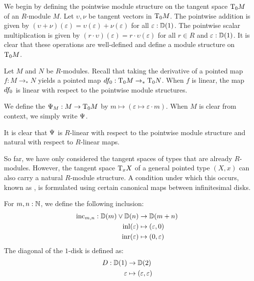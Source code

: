 \begin{definition}\label{def:pointwise-module-structure}
We begin by defining the pointwise module structure on the tangent space $\tangent{M}{0}$ of an $R$-module $M$.
Let $\upsilon, \nu$ be tangent vectors in $\tangent{M}{0}$.
The pointwise addition is given by $(\upsilon + \nu)(\varepsilon) = \upsilon (\varepsilon) + \nu (\varepsilon)$ for all $\varepsilon : \D(1)$.
The pointwise scalar multiplication is given by $(r \cdot \upsilon)(\varepsilon) = r \cdot \upsilon (\varepsilon)$ for all $r \in R$ and $\varepsilon : \D(1)$.
It is clear that these operations are well-defined and define a module structure on $\tangent{M}{0}$.
\end{definition}

\begin{remark}
  Let $M$ and $N$ be $R$-modules.
  Recall that taking the derivative of a pointed map $f : M \to_\ast N$ yields a pointed map $\der{f}{0} : \tangent{M}{0} \to_\ast \tangent{N}{0}$.
  When $f$ is linear, the map $\der{f}{0}$ is linear with respect to the pointwise module structures.
\end{remark}

\begin{definition}\label{def:canonical-map}
We define the  $\can_M : M \rightarrow \tangent{M}{0}$ by $m \mapsto (\varepsilon \mapsto \varepsilon \cdot m)$.
When $M$ is clear from context, we simply write $\can$.
\end{definition}

It is clear that $\can$ is $R$-linear with respect to the pointwise module structure and natural with respect to $R$-linear maps.

So far, we have only considered the tangent spaces of types that are already $R$-modules.
However, the tangent space $\tangent{X}{x}$ of a general pointed type $(X,x)$ can also carry a natural $R$-module structure.
A condition under which this occurs, known as , is formulated using certain canonical maps between infinitesimal disks.

For $m, n : \N$, we define the following inclusion:
\begin{align*}
  \inc_{m,n} : \D(m) \vee \D(n) & \rightarrow \D(m+n) \\
  \inl (\varepsilon) & \mapsto (\varepsilon, 0) \\
  \inr (\varepsilon) & \mapsto (0, \varepsilon)
\end{align*}
The diagonal of the $1$-disk is defined as:
\begin{align*}
  D : \D(1) & \rightarrow \D(2) \\
  \varepsilon & \mapsto (\varepsilon,\varepsilon)
\end{align*}

